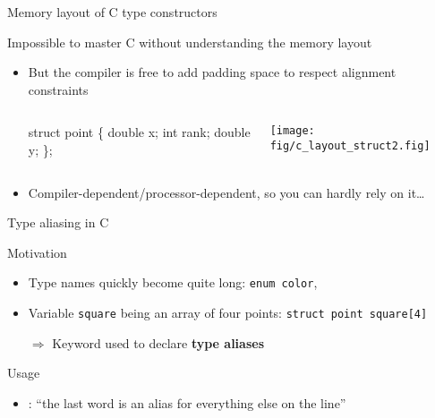 \begin{Coupe}
\begin{frame}[fragile]{Memory layout of C type constructors}
\begin{block}{Impossible to master C without understanding the memory layout}
    \begin{itemize}
    \item But the compiler is free to add \alert{padding space} to respect alignment constraints
    \begin{columns}
      \begin{column}{.3\linewidth}
        \begin{boitecode}{}
struct point \{
  double x;
  int rank;                  
  double y;    
\};
        \end{boitecode}
      \end{column}
      \begin{column}{.6\linewidth}
        \texttt{[image: fig/c\_layout\_struct2.fig]}
      \end{column}
    \end{columns}
  \item Compiler-dependent/processor-dependent, so you can hardly rely on it\ldots
    \end{itemize}
  \end{block}
\end{frame}
\begin{frame}{Type aliasing in C}
  \begin{block}{Motivation}\vspace{-.3\baselineskip}
    \begin{itemize}
    \item Type names quickly become quite long: \texttt{enum color},
    \item Variable \texttt{square} being an array of four points:
      \texttt{struct point square[4]}
    \item[$\Rightarrow$] Keyword  used to declare
      \textbf{type aliases}
    \end{itemize}
  \end{block}\vspace{-\baselineskip}
  \begin{block}{Usage}\vspace{-.3\baselineskip}
    \begin{itemize}
    \item {}: ``the last word is an alias for
      everything else on the line''
    \end{itemize}
  \begin{columns}
    \begin{column}{.45\linewidth}

\end{column}
\end{columns}
\end{block}
\end{frame}
\end{Coupe}
